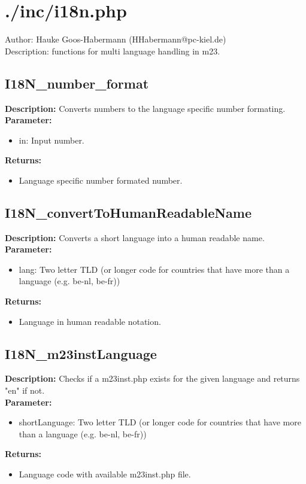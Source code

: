 \newpage\section{./inc/i18n.php}
 Author: Hauke Goos-Habermann (HHabermann@pc-kiel.de)\\
 Description: functions for multi language handling in m23.\\

\subsection{I18N\_number\_format}
\textbf{Description:} Converts numbers to the language specific number formating.\\
\textbf{Parameter:}
\begin{itemize}
\item in: Input number.
\end{itemize}
\textbf{Returns:}
\begin{itemize}
\item Language specific number formated number.
\end{itemize}

\subsection{I18N\_convertToHumanReadableName}
\textbf{Description:} Converts a short language into a human readable name.\\
\textbf{Parameter:}
\begin{itemize}
\item lang: Two letter TLD (or longer code for countries that have more than a language (e.g. be-nl, be-fr))
\end{itemize}
\textbf{Returns:}
\begin{itemize}
\item Language in human readable notation.
\end{itemize}

\subsection{I18N\_m23instLanguage}
\textbf{Description:} Checks if a m23inst.php exists for the given language and returns "en" if not.\\
\textbf{Parameter:}
\begin{itemize}
\item shortLanguage: Two letter TLD (or longer code for countries that have more than a language (e.g. be-nl, be-fr))
\end{itemize}
\textbf{Returns:}
\begin{itemize}
\item Language code with available m23inst.php file.
\end{itemize}

